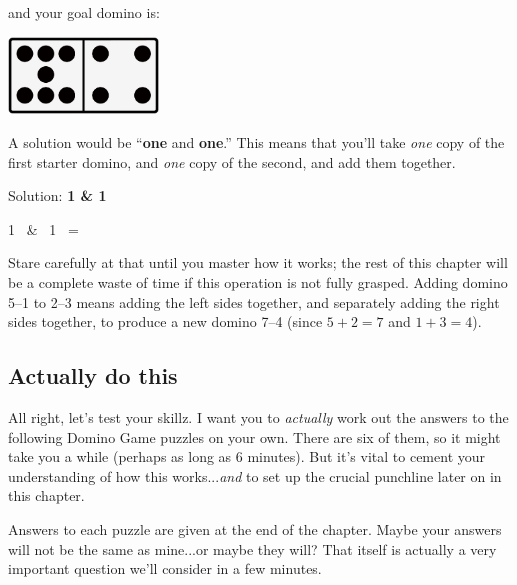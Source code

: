 and your goal domino is:
\begin{center}
\includegraphics[width=0.3\textwidth]{white7_4.png}
\end{center}

A solution would be ``\textbf{one} and \textbf{one}.'' This means that you'll
take \textit{one} copy of the first starter domino, and \textit{one} copy of
the second, and add them together.

\begin{center}
{\LARGE Solution: \textbf{1 \& 1}}

1  \ \& \
1  \ = \
 \quad
\end{center}

Stare carefully at that until you master how it works; the rest of this chapter
will be a complete waste of time if this operation is not fully grasped. Adding
domino 5--1 to 2--3 means adding the left sides together, and separately adding
the right sides together, to produce a new domino 7--4 (since $5+2=7$ and
$1+3=4$).

\subsection{Actually do this}

All right, let's test your skillz. I want you to \textit{actually} work out the
answers to the following Domino Game puzzles on your own. There are six of
them, so it might take you a while (perhaps as long as 6 minutes). But it's
vital to cement your understanding of how this works...\textit{and} to set up
the crucial punchline later on in this chapter.

Answers to each puzzle are given at the end of the chapter. Maybe your answers
will not be the same as mine...or maybe they will? That itself is actually a
very important question we'll consider in a few minutes.

